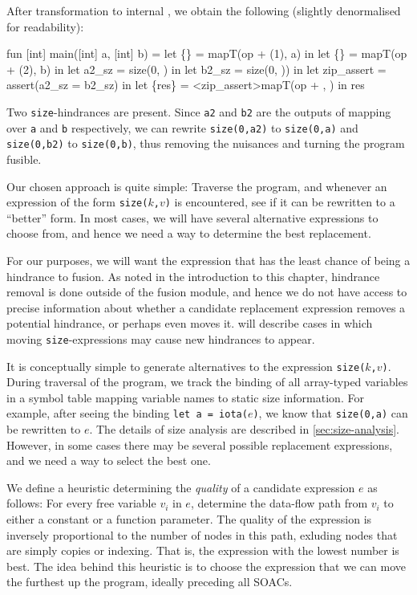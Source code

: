 After transformation to internal \LO{}, we obtain the following
(slightly denormalised for readability):

\begin{colorcode}
fun [int] main([int] a, [int] b) =
  let \{\} = mapT(op + (1), a) in
  let \{\} = mapT(op + (2), b) in
  let a2_sz = size(0, ) in
  let b2_sz = size(0, )) in
  let zip_assert = assert(a2_sz = b2_sz) in
  let \{res\} = <zip_assert>mapT(op + , ) in
  res
\end{colorcode}

Two \texttt{size}-hindrances are present.  Since \texttt{a2} and
\texttt{b2} are the outputs of mapping over \texttt{a} and \texttt{b}
respectively, we can rewrite \texttt{size(0,a2)} to \texttt{size(0,a)}
and \texttt{size(0,b2)} to \texttt{size(0,b)}, thus removing the
nuisances and turning the program fusible.

Our chosen approach is quite simple: Traverse the program, and
whenever an expression of the form \texttt{size($k$,$v$)} is
encountered, see if it can be rewritten to a ``better'' form.  In most
cases, we will have several alternative expressions to choose from,
and hence we need a way to determine the best replacement.

For our purposes, we will want the expression that has the least
chance of being a hindrance to fusion.  As noted in the introduction
to this chapter, hindrance removal is done outside of the fusion
module, and hence we do not have access to precise information about
whether a candidate replacement expression removes a potential
hindrance, or perhaps even moves it.
 will describe cases in which
moving \texttt{size}-expressions may cause new hindrances to appear.

It is conceptually simple to generate alternatives to the expression
\texttt{size($k$,$v$)}.  During traversal of the program, we track the
binding of all array-typed variables in a symbol table mapping
variable names to static size information.  For example, after seeing
the binding \texttt{let~a~=~iota($e$)}, we know that
\texttt{size(0,a)} can be rewritten to \texttt{$e$}.  The details of
size analysis are described in \cref{sec:size-analysis}.  However, in
some cases there may be several possible replacement expressions, and
we need a way to select the best one.

We define a heuristic determining the \textit{quality} of a candidate
expression $e$ as follows: For every free variable $v_{i}$ in $e$,
determine the data-flow path from $v_{i}$ to either a constant or a
function parameter.  The quality of the expression is inversely
proportional to the number of nodes in this path, exluding nodes that
are simply copies or indexing.  That is, the expression with the
lowest number is best.  The idea behind this heuristic is to choose
the expression that we can move the furthest up the program, ideally
preceding all SOACs.

